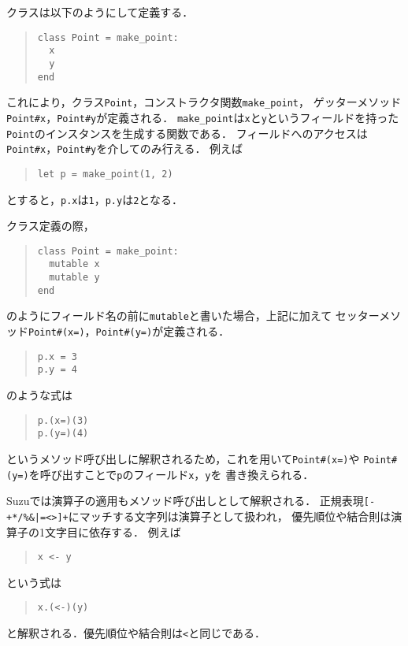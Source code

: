 \documentclass[a4paper,11pt,dvipdfmx]{jreport}
\begin{document}
クラスは以下のようにして定義する．
\begin{quote}
\begin{verbatim}
class Point = make_point:
  x
  y
end
\end{verbatim}
\end{quote}
これにより，クラス\verb|Point|，コンストラクタ関数\verb|make_point|，
ゲッターメソッド\verb|Point#x|，\verb|Point#y|が定義される．
\verb|make_point|は\verb|x|と\verb|y|というフィールドを持った
\verb|Point|のインスタンスを生成する関数である．
フィールドへのアクセスは\verb|Point#x|，\verb|Point#y|を介してのみ行える．
例えば
\begin{quote}
\begin{verbatim}
let p = make_point(1, 2)
\end{verbatim}
\end{quote}
とすると，\verb|p.x|は\verb|1|，\verb|p.y|は\verb|2|となる．

クラス定義の際，
\begin{quote}
\begin{verbatim}
class Point = make_point:
  mutable x
  mutable y
end
\end{verbatim}
\end{quote}
のようにフィールド名の前に\verb|mutable|と書いた場合，上記に加えて
セッターメソッド\verb|Point#(x=)|，\verb|Point#(y=)|が定義される．
\begin{quote}
\begin{verbatim}
p.x = 3
p.y = 4
\end{verbatim}
\end{quote}
のような式は
\begin{quote}
\begin{verbatim}
p.(x=)(3)
p.(y=)(4)
\end{verbatim}
\end{quote}
というメソッド呼び出しに解釈されるため，これを用いて\verb|Point#(x=)|や
\verb|Point#(y=)|を呼び出すことで\verb|p|のフィールド\verb|x|，\verb|y|を
書き換えられる．

Suzuでは演算子の適用もメソッド呼び出しとして解釈される．
正規表現\verb$[-+*/%&|=<>]+$にマッチする文字列は演算子として扱われ，
優先順位や結合則は演算子の1文字目に依存する．
例えば
\begin{quote}
\begin{verbatim}
x <- y
\end{verbatim}
\end{quote}
という式は
\begin{quote}
\begin{verbatim}
x.(<-)(y)
\end{verbatim}
\end{quote}
と解釈される．優先順位や結合則は\verb|<|と同じである．
\end{document}
